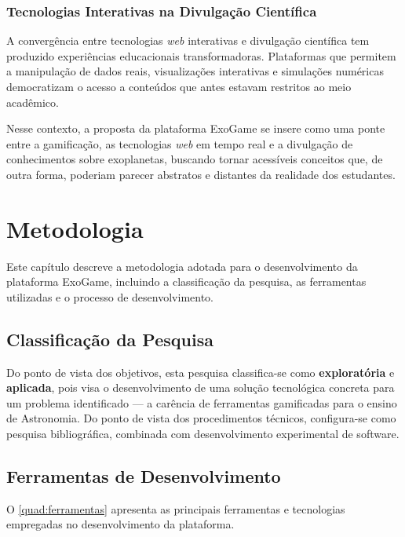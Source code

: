 \documentclass[
	12pt,
	openany,
	oneside,
	a4paper,
	english,
	brazil
]{abntex2}
\begin{document}
\subsection{Tecnologias Interativas na Divulgação Científica}

A convergência entre tecnologias \textit{web} interativas e divulgação científica tem produzido experiências educacionais transformadoras. Plataformas que permitem a manipulação de dados reais, visualizações interativas e simulações numéricas democratizam o acesso a conteúdos que antes estavam restritos ao meio acadêmico.

Nesse contexto, a proposta da plataforma ExoGame se insere como uma ponte entre a gamificação, as tecnologias \textit{web} em tempo real e a divulgação de conhecimentos sobre exoplanetas, buscando tornar acessíveis conceitos que, de outra forma, poderiam parecer abstratos e distantes da realidade dos estudantes.


\chapter{Metodologia}\label{cap:metodologia}

Este capítulo descreve a metodologia adotada para o desenvolvimento da plataforma ExoGame, incluindo a classificação da pesquisa, as ferramentas utilizadas e o processo de desenvolvimento.

\section{Classificação da Pesquisa}

Do ponto de vista dos objetivos, esta pesquisa classifica-se como \textbf{exploratória} e \textbf{aplicada}, pois visa o desenvolvimento de uma solução tecnológica concreta para um problema identificado --- a carência de ferramentas gamificadas para o ensino de Astronomia. Do ponto de vista dos procedimentos técnicos, configura-se como pesquisa bibliográfica, combinada com desenvolvimento experimental de software.

\section{Ferramentas de Desenvolvimento}

O \autoref{quad:ferramentas} apresenta as principais ferramentas e tecnologias empregadas no desenvolvimento da plataforma.
\end{document}
